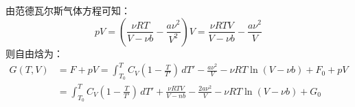 \documentclass[a4paper,12pt]{article}
\begin{document}
\subsection{}
由范德瓦尔斯气体方程可知：
\begin{equation}\nonumber
	pV = \left(\frac{\nu RT}{V-\nu b} - \frac{a\nu^2}{V^2}\right)V = \frac{\nu RTV}{V-\nu b} - \frac{a\nu^2}{V}
\end{equation}
则自由焓为：
\begin{equation}\nonumber
\begin{aligned}
	G(T,V) &= F + pV = \int_{T_0}^{T}C_V\left(1-\frac{T}{T'}\right)\,dT' - \frac{a\nu^2}{V} -\nu RT\ln(V-\nu b) + F_0 + pV\\
	&= \int_{T_0}^{T}C_V\left(1-\frac{T}{T'}\right)\,dT' + \frac{\nu RTV}{V-nb} - \frac{2a\nu^2}{V} -\nu RT\ln(V-\nu b) +G_0
\end{aligned}
\end{equation}
\end{document}
